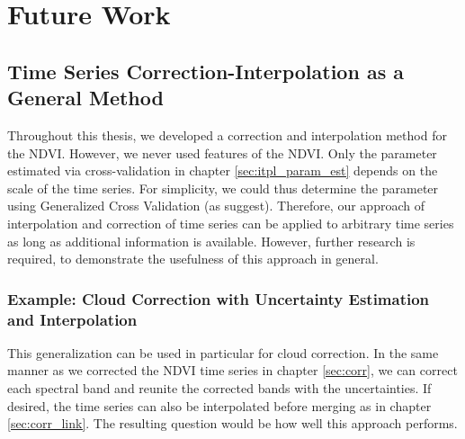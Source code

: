 \section{Future Work}{
    \label{ss:FutureWork}

    \subsection{Time Series Correction-Interpolation as a General Method}{
        Throughout this thesis, we developed a correction and interpolation method for the NDVI. However, we never used features of the NDVI. Only the parameter estimated via cross-validation in chapter \ref{sec:itpl_param_est} depends on the scale of the time series. For simplicity, we could thus determine the parameter using Generalized Cross Validation (as  suggest). Therefore, our approach of interpolation and correction of time series can be applied to arbitrary time series as long as additional information is available. However, further research is required, to demonstrate the usefulness of this approach in general.


        \subsubsection*{Example: Cloud Correction with Uncertainty Estimation and Interpolation}
            This generalization can be used in particular for cloud correction. In the same manner as we corrected the NDVI time series in chapter \ref{sec:corr}, we can correct each spectral band and reunite the corrected bands with the uncertainties. If desired, the time series can also be interpolated before merging as in chapter \ref{sec:corr_link}. The resulting question would be how well this approach performs.
    }



}
